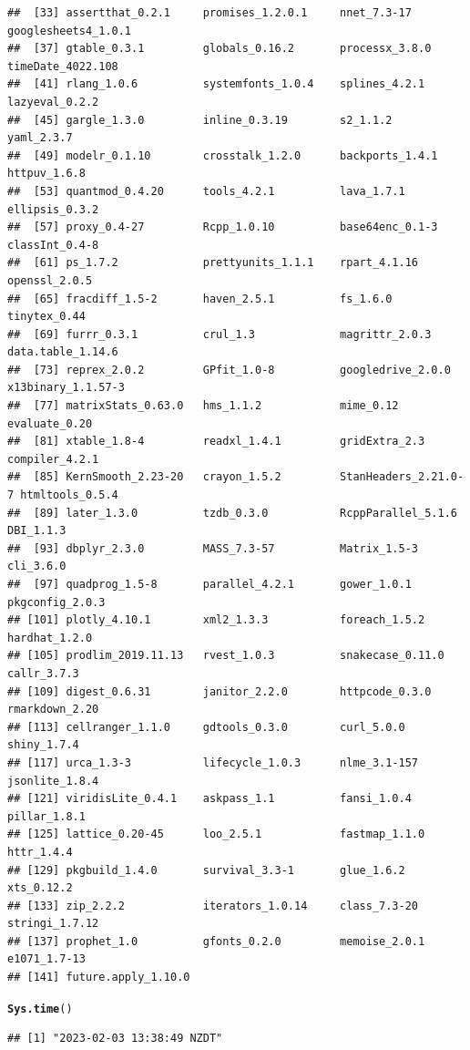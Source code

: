 \documentclass{article}\usepackage[]{graphicx}\usepackage[]{xcolor}
\makeatletter
\newcommand{\hlstd}[1]{\textcolor[rgb]{0.345,0.345,0.345}{#1}}%
\newcommand{\hlkwd}[1]{\textcolor[rgb]{0.737,0.353,0.396}{\textbf{#1}}}%
\newenvironment{kframe}{%
 \def\at@end@of@kframe{}%
 \ifinner\ifhmode%
  \def\at@end@of@kframe{\end{minipage}}%
  \begin{minipage}{\columnwidth}%
 \fi\fi%
 \def\FrameCommand##1{\hskip\@totalleftmargin \hskip-\fboxsep
 \colorbox{shadecolor}{##1}\hskip-\fboxsep
     \hskip-\linewidth \hskip-\@totalleftmargin \hskip\columnwidth}%
 \MakeFramed {\advance\hsize-\width
   \@totalleftmargin\z@ \linewidth\hsize
   \@setminipage}}%
 {\par\unskip\endMakeFramed%
 \at@end@of@kframe}
\newenvironment{knitrout}{}{} %
\makeatother
\begin{document}
\begin{knitrout}
\begin{kframe}
\begin{verbatim}
##  [33] assertthat_0.2.1     promises_1.2.0.1     nnet_7.3-17          googlesheets4_1.0.1 
##  [37] gtable_0.3.1         globals_0.16.2       processx_3.8.0       timeDate_4022.108   
##  [41] rlang_1.0.6          systemfonts_1.0.4    splines_4.2.1        lazyeval_0.2.2      
##  [45] gargle_1.3.0         inline_0.3.19        s2_1.1.2             yaml_2.3.7          
##  [49] modelr_0.1.10        crosstalk_1.2.0      backports_1.4.1      httpuv_1.6.8        
##  [53] quantmod_0.4.20      tools_4.2.1          lava_1.7.1           ellipsis_0.3.2      
##  [57] proxy_0.4-27         Rcpp_1.0.10          base64enc_0.1-3      classInt_0.4-8      
##  [61] ps_1.7.2             prettyunits_1.1.1    rpart_4.1.16         openssl_2.0.5       
##  [65] fracdiff_1.5-2       haven_2.5.1          fs_1.6.0             tinytex_0.44        
##  [69] furrr_0.3.1          crul_1.3             magrittr_2.0.3       data.table_1.14.6   
##  [73] reprex_2.0.2         GPfit_1.0-8          googledrive_2.0.0    x13binary_1.1.57-3  
##  [77] matrixStats_0.63.0   hms_1.1.2            mime_0.12            evaluate_0.20       
##  [81] xtable_1.8-4         readxl_1.4.1         gridExtra_2.3        compiler_4.2.1      
##  [85] KernSmooth_2.23-20   crayon_1.5.2         StanHeaders_2.21.0-7 htmltools_0.5.4     
##  [89] later_1.3.0          tzdb_0.3.0           RcppParallel_5.1.6   DBI_1.1.3           
##  [93] dbplyr_2.3.0         MASS_7.3-57          Matrix_1.5-3         cli_3.6.0           
##  [97] quadprog_1.5-8       parallel_4.2.1       gower_1.0.1          pkgconfig_2.0.3     
## [101] plotly_4.10.1        xml2_1.3.3           foreach_1.5.2        hardhat_1.2.0       
## [105] prodlim_2019.11.13   rvest_1.0.3          snakecase_0.11.0     callr_3.7.3         
## [109] digest_0.6.31        janitor_2.2.0        httpcode_0.3.0       rmarkdown_2.20      
## [113] cellranger_1.1.0     gdtools_0.3.0        curl_5.0.0           shiny_1.7.4         
## [117] urca_1.3-3           lifecycle_1.0.3      nlme_3.1-157         jsonlite_1.8.4      
## [121] viridisLite_0.4.1    askpass_1.1          fansi_1.0.4          pillar_1.8.1        
## [125] lattice_0.20-45      loo_2.5.1            fastmap_1.1.0        httr_1.4.4          
## [129] pkgbuild_1.4.0       survival_3.3-1       glue_1.6.2           xts_0.12.2          
## [133] zip_2.2.2            iterators_1.0.14     class_7.3-20         stringi_1.7.12      
## [137] prophet_1.0          gfonts_0.2.0         memoise_2.0.1        e1071_1.7-13        
## [141] future.apply_1.10.0
\end{verbatim}
\begin{alltt}
\hlkwd{Sys.time}\hlstd{()}
\end{alltt}
\begin{verbatim}
## [1] "2023-02-03 13:38:49 NZDT"
\end{verbatim}
\end{kframe}
\end{knitrout}
\end{document}
